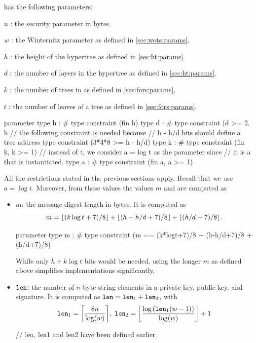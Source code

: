 \spx has the following parameters:
\begin{description}
 \item  $n$ : the security parameter in bytes.
 \item  $w$ : the Winternitz parameter as defined in \autoref{sec:wots:params}.
 \item  $h$ : the height of the hypertree as defined in \autoref{sec:ht:params}.
 \item  $d$ : the number of layers in the hypertree as defined in \autoref{sec:ht:params}.
 \item  $k$ : the number of trees in \fors as defined in \autoref{sec:fors:params}.
 \item  $t$ : the number of leaves of a \fors tree as defined in \autoref{sec:fors:params}.
\end{description}

\begin{code}
  parameter
    type h : #
    type constraint (fin h)
    type d : #
    type constraint (d >= 2, h%
    // the following constraint is needed because
    // h - h/d bits should define a tree address
    type constraint (3*4*8 >= h - h/d)
    type k : #
    type constraint (fin k, k >= 1)
    // instead of t, we consider a = log t as the parameter since
    // it is a that is instantiated.
    type a : #
    type constraint (fin a, a >= 1)
\end{code}

All the restrictions stated in the previous sections apply. Recall that 
we use $a = \log t$. Moreover, from these values the values $m$ and \len are
computed as
\begin{itemize}
  \item $m$: the message digest length in bytes. 
  It is computed as 
  $$m=\lfloor(k\log t +7)/ 8\rfloor + \lfloor(h - h/d +7)/ 8\rfloor + \lfloor(h / d +7)/ 8\rfloor.$$

\begin{code}
  parameter
    type m : #
    type constraint (m == (k*logt+7)/8 + (h-h/d+7)/8 + (h/d+7)/8)
\end{code}

  While only $h + k\log t$ bits would be needed, using the longer $m$ as defined 
  above simplifies implementations significantly.
  \item $\texttt{len}$: the number of $n$-byte string elements in a \wotsp private
        key, public key, and signature. It is computed as $\texttt{len} =
        \texttt{len}_1 + \texttt{len}_2$, with
        \begin{equation*}
          \len_1 = \ceil*{\frac{8n}{\log(w)}},\
          \len_2 = \floor*{\frac{\log{(\len_1(w - 1))}}{\log(w)}} + 1
        \end{equation*}

\begin{code}
  // len, len1 and len2 have been defined earlier
\end{code}
\end{itemize}

